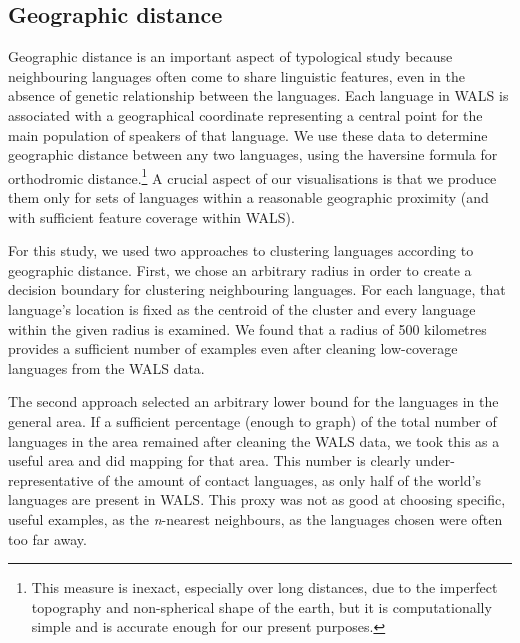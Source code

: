 \documentclass[11pt]{article}
\begin{document}
\subsection{Geographic distance}
Geographic distance is an important aspect of typological study because neighbouring  languages often come to share linguistic features, even in the absence of genetic relationship between the languages. Each language in WALS is associated with a geographical coordinate representing a central point for the main population of speakers of that language. We use these data to determine geographic distance between any two languages, using the haversine formula for orthodromic distance.\footnote{This measure is inexact, especially over long distances, due to the imperfect topography and non-spherical shape of the earth, but it is computationally simple and is accurate enough for our present purposes.}
A crucial aspect of our visualisations is that we produce them only for sets of languages within a reasonable geographic proximity (and with sufficient feature coverage within WALS).

For this study, we used two approaches to clustering languages according to geographic distance. First, we chose an arbitrary radius in order to create a decision boundary for clustering neighbouring languages. For each language, that language's location is fixed as the centroid of the cluster and every language within the given radius is examined. We found that a radius of 500 kilometres provides a sufficient number of examples even after cleaning low-coverage languages from the WALS data. 

The second approach selected an arbitrary lower bound for the languages in the general area. If a sufficient percentage (enough to graph) of the total number of languages in the area remained after cleaning the WALS data, we took this as a useful area and did mapping for that area. This number is clearly under-representative of the amount of contact languages, as only half of the world's languages are present in WALS. This proxy was not as good at choosing specific, useful examples, as the \emph{n}-nearest neighbours, as the languages chosen were often too far away. 
\end{document}
